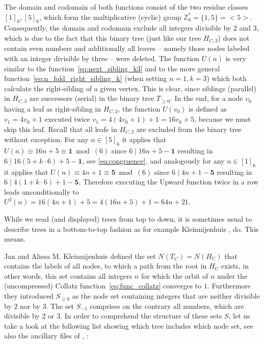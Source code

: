The domain and codomain of both functions consist of the two residue classes $[1]_6,[5]_6$, which form the multiplicative (cyclic) group $\mathbb{Z}^\ast_6=\{1,5\}=<5>$. Consequently, the domain and codomain exclude all integers divisible by $2$ and $3$, which is due to the fact that this binary tree (just like our tree $H_{C,3}$) does not contain even numbers and additionally all leaves -- namely those nodes labeled with an integer divisible by three -- were deleted. The function $U(n)$ is very similar to the function~\ref{eq:next_sibling_k3} and to the more general function~\ref{eq:n_fold_right_sibling_k} (when setting $n=1,k=3$) which both calculate the right-sibling of a given vertex. This is clear, since siblings (parallel) in $H_{C,3}$ are successors (serial) in the binary tree $T_{\ge0}$. In the end, for a node $v_0$ having a leaf as right-sibling in $H_{C,3}$, the function $U(v_0)$ is defined as $v_1=4v_0+1$ executed twice $v_1=4(4v_0+1)+1=16v_0+5$, because we must skip this leaf. Recall that all leafs in $H_{C,3}$ are excluded from the binary tree without exception. For any $n\in[5]_6$ it applies that $U(n)\equiv16n+5\equiv\boldsymbol{1}\bmod(6)$ since $6\mid16n+5-\boldsymbol{1}$ resulting in $6\mid16(5+k\cdot6)+5-\boldsymbol{1}$, see \ref{eq:congruence}, and analogously for any $n\in[1]_6$ it applies that $U(n)\equiv4n+1\equiv\boldsymbol{5}\bmod(6)$ since $6\mid4n+1-\boldsymbol{5}$ resulting in $6\mid4(1+k\cdot6)+1-\boldsymbol{5}$. Therefore executing the Upward function twice in a row leads unconditionally to $U^2(n)=16(4n+1)+5=4(16n+5)+1=64n+21$.

\begin{remark}
	While we read (and displayed) trees from top to down, it is sometimes usual to describe trees in a bottom-to-top fashion as for example Kleinnijenhuis \cite{Ref_Kleinnijenhuis_2020a}, \cite{Ref_Kleinnijenhuis_2020b} do. This means.
\end{remark}

\par\medskip
Jan and Alissa M. Kleinnijenhuis \cite{Ref_Kleinnijenhuis_2020a} defined the set $N(T_C)=N(H_U)$ that contains the labels of all nodes, to which a path from the root in $H_U$ exists, in other words, this set contains all integers $n$ for which the orbit of $n$ under the (uncompressed) Collatz function~\ref{eq:func_collatz} converges to $1$. Furthermore they introduced $S_{\ge0}$ as the node set containing integers that are neither divisible by $2$ nor by $3$. The set $S_{-1}$ comprises on the contrary all numbers, which are divisible by $2$ or $3$. In order to comprehend the structure of these sets $S$, let us take a look at the following list showing which tree includes which node set, see also the ancillary files of \cite{Ref_Kleinnijenhuis_2020a}, \cite{Ref_Kleinnijenhuis_2020b}:

